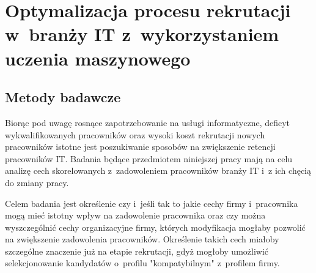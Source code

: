 \chapter{Optymalizacja procesu rekrutacji w~branży IT z~wykorzystaniem uczenia maszynowego}\label{ch:analysis}
\section{Metody badawcze}\label{sec:analysis-method}
Biorąc pod uwagę rosnące zapotrzebowanie na usługi informatyczne, deficyt wykwalifikowanych pracowników \cite{daxx-2021} oraz wysoki koszt rekrutacji nowych pracowników \cite{hairing-dev-2021} istotne jest poszukiwanie sposobów na zwiększenie retencji pracowników IT.
Badania będące przedmiotem niniejszej pracy mają na celu analizę cech skorelowanych z~zadowoleniem pracowników branży IT i~z ich chęcią do zmiany pracy.
%
%

Celem badania jest określenie czy i~jeśli tak to jakie cechy firmy i~pracownika mogą mieć istotny wpływ na zadowolenie pracownika
oraz czy można wyszczególnić cechy organizacyjne firmy, których modyfikacja mogłaby pozwolić na zwiększenie zadowolenia pracowników.
Określenie takich cech miałoby szczególne znaczenie już na etapie rekrutacji, gdyż mogłoby umożliwić selekcjonowanie kandydatów o~profilu "kompatybilnym" z~profilem firmy.



